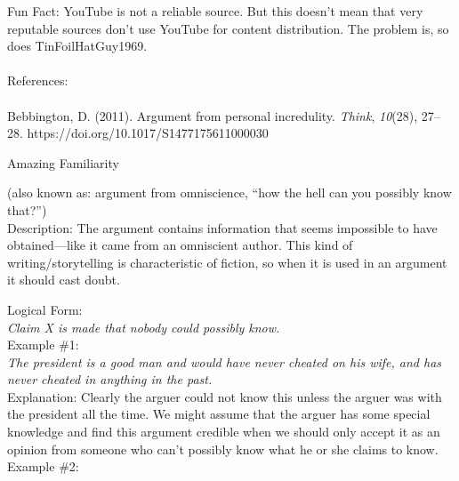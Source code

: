 \documentclass[a4paper,12pt,single,pdftex]{scrbook}
\begin{document}
{    
      Fun Fact: YouTube is not a reliable source. But this doesn’t mean that very reputable sources don’t use YouTube for content distribution. The problem is, so does TinFoilHatGuy1969.
    \\

    
      
    \\

    
      References:
    \\

    
      
        
      \\

      
        
          Bebbington, D. (2011). Argument from personal incredulity. {\it Think}, {\it 10}(28), 27–28. https://doi.org/10.1017/S1477175611000030
        
      
    
  }


Amazing Familiarity
    
      (also known as: argument from omniscience, “how the hell can you possibly know that?”)
    \\

  
    Description: The argument contains information that seems impossible to have obtained—like it came from an omniscient author. This kind of writing/storytelling is characteristic of fiction, so when it is used in an argument it should cast doubt.

    
      Logical Form:
    \\

    
      {\em Claim X is made that nobody could possibly know.}
    \\

    
      Example \#1:
    \\

    
      {\em The president is a good man and would have never cheated on his wife, and has never cheated in anything in the past.}
    \\

    
      Explanation: Clearly the arguer could not know this unless the arguer was with the president all the time. We might assume that the arguer has some special knowledge and find this argument credible when we should only accept it as an opinion from someone who can't possibly know what he or she claims to know.
    \\

    
      Example \#2:
    \\
\end{document}
